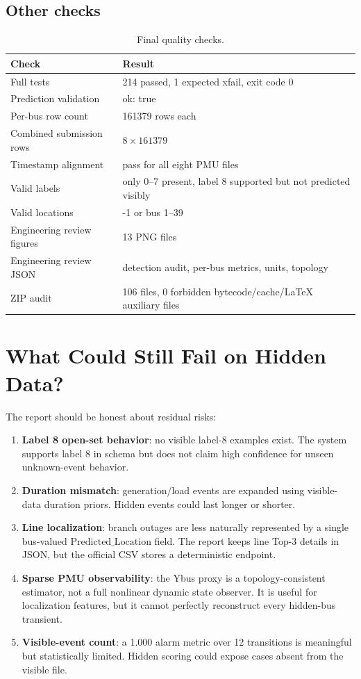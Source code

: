 \documentclass[11pt]{article}
\newcommand{\PredLoc}{\ensuremath{\mathrm{Predicted\_Location}}}
\begin{document}
\subsection{Other checks}

\begin{table}[H]
\centering
\caption{Final quality checks.}
\begin{tabular}{ll}
\toprule
Check & Result \\
\midrule
Full tests & 214 passed, 1 expected xfail, exit code 0 \\
Prediction validation & ok: true \\
Per-bus row count & 161379 rows each \\
Combined submission rows & $8\times161379$ \\
Timestamp alignment & pass for all eight PMU files \\
Valid labels & only 0--7 present, label 8 supported but not predicted visibly \\
Valid locations & -1 or bus 1--39 \\
Engineering review figures & 13 PNG files \\
Engineering review JSON & detection audit, per-bus metrics, units, topology \\
ZIP audit & 106 files, 0 forbidden bytecode/cache/LaTeX auxiliary files \\
\bottomrule
\end{tabular}
\label{tab:audit}
\end{table}

\section{What Could Still Fail on Hidden Data?}

The report should be honest about residual risks:

\begin{enumerate}
  \item \textbf{Label 8 open-set behavior}: no visible label-8 examples exist.
  The system supports label 8 in schema but does not claim high confidence for
  unseen unknown-event behavior.
  \item \textbf{Duration mismatch}: generation/load events are expanded using
  visible-data duration priors. Hidden events could last longer or shorter.
  \item \textbf{Line localization}: branch outages are less naturally represented
  by a single bus-valued \PredLoc{} field. The report keeps line Top-3 details in
  JSON, but the official CSV stores a deterministic endpoint.
  \item \textbf{Sparse PMU observability}: the Ybus proxy is a topology-consistent
  estimator, not a full nonlinear dynamic state observer. It is useful for
  localization features, but it cannot perfectly reconstruct every hidden-bus
  transient.
  \item \textbf{Visible-event count}: a 1.000 alarm metric over 12 transitions is
  meaningful but statistically limited. Hidden scoring could expose cases absent
  from the visible file.
\end{enumerate}
\end{document}
